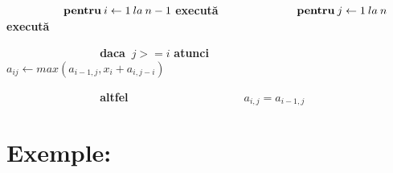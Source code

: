 \documentclass{article}
\begin{document}
\begin{enumerate}
\indent $ \> \> \> \> \> \> $ $ \> \> \> \> \> \> $ $ \> \> \> \> \> \> $ $ {\bf pentru} \> i \leftarrow 1 \> la \> n-1 $ {\bf execut\u{a}} 
\newline
\indent $ \> \> \> \> \> \> $ $ \> \> \> \> \> \> $ $ \> \> \> \> \> \> $ $ \> \> \> \> \> \> $  $ {\bf pentru} \> j \leftarrow 1 \> la \> n $ {\bf execut\u{a}} 
\newline

\indent $ \> \> \> \> \> \> $ $ \> \> \> \> \> \> $ $ \> \> \> \> \> \> $ $ \> \> \> \> \> \> $ $ \> \> \> \> \> \> $ {\bf daca} $ \> j >= i $ {\bf atunci}
\newline
\indent $ \> \> \> \> \> \> $ $ \> \> \> \> \> \> $ $ \> \> \> \> \> \> $ $ \> \> \> \> \> \> $ $ \> \> \> \> \> \> $ $ \> \> \> \> \> \> $ $ a_{ij} \leftarrow max(a_{i-1,j},x_i+a_{i,j-i}) $

\indent $ \> \> \> \> \> \> $ $ \> \> \> \> \> \> $ $ \> \> \> \> \> \> $ $ \> \> \> \> \> \> $ $ \> \> \> \> \> \> $ {\bf altfel} 
\newline
\indent $ \> \> \> \> \> \> $ $ \> \> \> \> \> \> $ $ \> \> \> \> \> \> $ $ \> \> \> \> \> \> $ $ \> \> \> \> \> \> $ $ \> \> \> \> \> \> $ $ a_{i,j}=a_{i-1,j} $

\end{enumerate}

\section{\textbf{ \huge Exemple:}}
\end{document}
